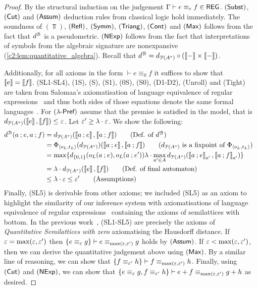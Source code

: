 \begin{proof}
By the structural induction on the judgement $\Gamma \vdash e \equiv_{\varepsilon} f \in \mathsf{REG}$. $(\textsf{Subst})$, $(\textsf{Cut})$ and $(\textsf{Assum})$ deduction rules from classical logic hold immediately. The soundness of $(\Top)$, $(\textsf{Refl})$, $(\textsf{Symm})$, $(\textsf{Triang})$, $(\textsf{Cont})$ and $(\textsf{Max})$ follows from the fact that $d^{\mathcal{B}}$ is a pseudometric. $(\textsf{NExp})$ follows from the fact that interpretations of symbols from the algebraic signature are nonexpansive (\cref{c2:lem:quantitative_algebra}). Recall that $d^{\mathcal{B}} = d_{\mathcal{P}({A}^{\ast})} \circ (\left\llbracket{-}\right\rrbracket \times \left\llbracket{-}\right\rrbracket)$. 

 Additionally, for all axioms in the form $\vdash e \equiv_0 f$ it suffices to show that $\left\llbracket{e}\right\rrbracket = \left\llbracket{f}\right\rrbracket$. \textsf{(SL1-SL4)}, \textsf{(1S)}, \textsf{(S)}, \textsf{(S1)}, \textsf{(0S)}, \textsf{(S0)}, \textsf{(D1-D2)}, \textsf{(Unroll)} and \textsf{(Tight)} are taken from Salomaa's axiomatisation of language equivalence of regular expressions~\cite{Salomaa:1966:Two} and thus both sides of those equations denote the same formal languages~\cite[Theorem~5.2]{Wagemaker:2019:Completeness}. For $(\textsf{$\lambda$-Pref})$ assume that the premise is satisfied in the model, that is $d_{\mathcal{P}({A}^{\ast})}(\left\llbracket{e}\right\rrbracket,\left\llbracket{f}\right\rrbracket) \leq \varepsilon$. Let $\varepsilon' \geq \lambda \cdot \varepsilon$. We show the following:
\begin{align*}
    d^{\qalgB}(a \seq e, a \seq f) &= \langmetric(\sem{a \seq e}, \sem{a \seq f}) \tag{Def. of $d^{\qalgB}$}\\
    & = \Phi_{\langle o_L, t_L \rangle}(\langmetric)(\sem{a \seq e}, \sem{a \seq f}) \tag{$\langmetric$ is a fixpoint of $\Phi_{\langle o_L, t_L \rangle}$}\\
    &= \max\{d_{\{0,1\}}(o_L(a \seq e), o_L(a \seq e')) \lambda \cdot \max_{a' \in \alphabet}  \langmetric(\sem{a \seq e}_{a'}, \sem{a \seq f}_{a'} )\}\\
    &= \lambda \cdot \langmetric(\sem{e}, \sem{f}) \tag{Def. of final automaton} \\
    & \leq \lambda \cdot \e \leq \e' \tag{Assumptions} \\
\end{align*}
Finally, \textsf{(SL5)} is derivable from other axioms; we included \textsf{(SL5)} as an axiom to highlight the similarity of our inference system with axiomatisations of language equivalence of regular expressions~\cite{Salomaa:1966:Two,Kozen:1994:Completeness} containing the axioms of semilattices with bottom. In the previous work~\cite{Mardare:2016:Quantitative}, \textsf{(SL1-SL5)} are precisely the axioms of \emph{Quantitative Semilattices with zero} axiomatising the Hausdorff distance.  If $\varepsilon = \max(\varepsilon, \varepsilon')$ then $\{e \equiv_\varepsilon g \} \vdash e \equiv_{\max(\varepsilon, \varepsilon')} g$ holds by $(\textsf{Assum})$. If $\varepsilon < \max(\varepsilon, \varepsilon')$, then we can derive the quantitative judgement above using $(\textsf{Max})$. By a similar line of reasoning, we can show that $\{f \equiv_{\varepsilon'} h \} \vdash f \equiv_{\max(\varepsilon, \varepsilon')} h$. Finally, using $(\textsf{Cut})$ and $(\textsf{NExp})$, we can show that $\{e \equiv_{\varepsilon} g, f \equiv_{\varepsilon'} h\} \vdash e + f \equiv_{\max(\varepsilon,\varepsilon')} g + h$ as desired.
\end{proof}
